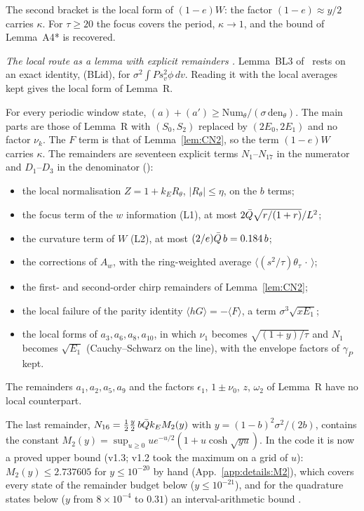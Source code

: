 The second bracket is the local form of $(1-e)W$: the factor $(1-e)\approx y/2$ carries $\kappa$.
For $\tau\ge20$ the focus covers the period, $\kappa\to1$, and the bound of Lemma~A4* is recovered.

\emph{The local route as a lemma with explicit remainders \proofst.}
Lemma~BL3 of~\cite{F} rests on an exact identity, (BLid), for $\sigma^2\int Ps_v^2\phi\,dv$.
Reading it with the local averages kept gives the local form of Lemma~R.
\begin{lemma} \proofst
\label{lem:Rtheta}
For every periodic window state, $(a)+(a')\ge\mathrm{Num}_\theta/(\sigma\,\mathrm{den}_\theta)$.
The main parts are those of Lemma~R with $(S_0,S_2)$ replaced by $(2E_0,2E_1)$ and no factor $\nu_k$.
The $F$ term is that of Lemma~\ref{lem:CN2}, so the term $(1-e)W$ carries $\kappa$.
The remainders are seventeen explicit terms $N_1$--$N_{17}$ in the numerator and $D_1$--$D_3$ in the denominator ():
\begin{itemize}
\item the local normalisation $Z=1+k_ER_\theta$, $|R_\theta|\le\eta$, on the $b$ terms;
\item the focus term of the $w$ information (L1), at most $2\bar Q\sqrt{r/(1+r)}/L^2$;
\item the curvature term of $W$ (L2), at most $(2/e)\bar Q\,b=0.184\,b$;
\item the corrections of $A_w$, with the ring-weighted average $\langle(s^2/\tau)\theta_\tau\,\cdot\,\rangle$;
\item the first- and second-order chirp remainders of Lemma~\ref{lem:CN2};
\item the local failure of the parity identity $\langle hG\rangle=-\langle F\rangle$, a term $\sigma^3\sqrt{xE_1}$;
\item the local forms of $a_3,a_6,a_8,a_{10}$, in which $\nu_1$ becomes $\sqrt{(1+y)/\tau}$ and $N_1$ becomes $\sqrt{E_1}$ (Cauchy--Schwarz on the line), with the envelope factors of $\gamma_P$ kept.
\end{itemize}
The remainders $a_1,a_2,a_5,a_9$ and the factors $\epsilon_1$, $1\pm\nu_0$, $z$, $\omega_2$ of Lemma~R have no local counterpart.
\end{lemma}
The last remainder, $N_{16}=\frac12\frac y2\,b\bar Q k_EM_2(y)$ with $y=(1-b)^2\sigma^2/(2b)$, contains the constant $M_2(y)=\sup_{u\ge0}ue^{-u/2}(1+u\cosh\sqrt{yu})$.
In the code it is now a proved upper bound (v1.3; v1.2 took the maximum on a grid of $u$): $M_2(y)\le2.737605$ for $y\le10^{-20}$ by hand (App.~\ref{app:details:M2}), which covers every state of the remainder budget below ($y\le10^{-21}$), and for the quadrature states below ($y$ from $8\times10^{-4}$ to $0.31$) an interval-arithmetic bound .
